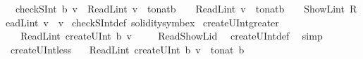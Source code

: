\begin{isabellebody}
\isanewline
\ \ {\isachardoublequoteopen}checkSInt\ b\ v\ {\isacharequal}{\kern0pt}\ {\isacharparenleft}{\kern0pt}ReadL\isactrlsub i\isactrlsub n\isactrlsub t\ v\ {\isasymge}\ {\isacharminus}{\kern0pt}{\isacharparenleft}{\kern0pt}{}{\isacharcircum}{\kern0pt}{\isacharparenleft}{\kern0pt}to{\isacharunderscore}{\kern0pt}nat{\isacharparenleft}{\kern0pt}b{\isacharparenright}{\kern0pt}\ {\isacharminus}{\kern0pt}\ {}{\isacharparenright}{\kern0pt}{\isacharparenright}{\kern0pt}\ {\isasymand}\ ReadL\isactrlsub i\isactrlsub n\isactrlsub t\ v\ {\isacharless}{\kern0pt}\ {}{\isacharcircum}{\kern0pt}{\isacharparenleft}{\kern0pt}to{\isacharunderscore}{\kern0pt}nat{\isacharparenleft}{\kern0pt}b{\isacharparenright}{\kern0pt}\ {\isacharminus}{\kern0pt}\ {}{\isacharparenright}{\kern0pt}\ {\isasymand}\ ShowL\isactrlsub i\isactrlsub n\isactrlsub t\ {\isacharparenleft}{\kern0pt}ReadL\isactrlsub i\isactrlsub n\isactrlsub t\ v{\isacharparenright}{\kern0pt}\ {\isacharequal}{\kern0pt}\ v{\isacharparenright}{\kern0pt}{\isachardoublequoteclose}\isanewline
{}\isamarkupfalse%
\ checkSInt{\isacharunderscore}{\kern0pt}def\ {\isacharbrackleft}{\kern0pt}solidity{\isacharunderscore}{\kern0pt}symbex{\isacharbrackright}{\kern0pt}\isanewline
\isanewline
{}\isamarkupfalse%
\ createUInt{\isacharunderscore}{\kern0pt}greater{\isacharcolon}{\kern0pt}\isanewline
\ \ \ {\isachardoublequoteopen}ReadL\isactrlsub i\isactrlsub n\isactrlsub t\ {\isacharparenleft}{\kern0pt}createUInt\ b\ v{\isacharparenright}{\kern0pt}\ {\isasymge}\ {}{\isachardoublequoteclose}%
\isadelimproof
\ %
\endisadelimproof
%
\isatagproof
{}\isamarkupfalse%
\ Read{\isacharunderscore}{\kern0pt}ShowL{\isacharunderscore}{\kern0pt}id\ \isamarkupfalse%
\ createUInt{\isacharunderscore}{\kern0pt}def\ \isamarkupfalse%
\ simp%
\endisatagproof
{\isafoldproof}%
%
\isadelimproof
%
\endisadelimproof
\isanewline
\isanewline
{}\isamarkupfalse%
\ createUInt{\isacharunderscore}{\kern0pt}less{\isacharcolon}{\kern0pt}\isanewline
\ \ \ {\isachardoublequoteopen}ReadL\isactrlsub i\isactrlsub n\isactrlsub t\ {\isacharparenleft}{\kern0pt}createUInt\ b\ v{\isacharparenright}{\kern0pt}\ {\isacharless}{\kern0pt}\ {\isacharparenleft}{\kern0pt}{}{\isacharcircum}{\kern0pt}{\isacharparenleft}{\kern0pt}to{\isacharunderscore}{\kern0pt}nat\ b{\isacharparenright}{\kern0pt}{\isacharparenright}{\kern0pt}{\isachardoublequoteclose}%
\isadelimproof

\end{isabellebody}
